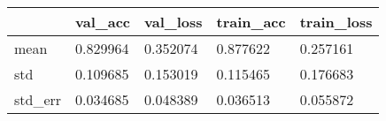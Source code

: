 \begin{tabular}{|l|l|l|l|l|}
\toprule \hline
 & val\_acc & val\_loss & train\_acc & train\_loss \\ \hline
\midrule
mean & 0.829964 & 0.352074 & 0.877622 & 0.257161 \\ \hline
std & 0.109685 & 0.153019 & 0.115465 & 0.176683 \\ \hline
std\_err & 0.034685 & 0.048389 & 0.036513 & 0.055872 \\ \hline
\bottomrule
\end{tabular}
